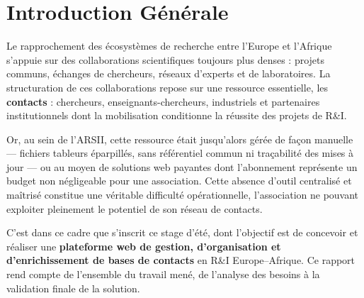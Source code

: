 
\chapter*{Introduction Générale}

Le rapprochement des écosystèmes de recherche entre l'Europe et l'Afrique s'appuie sur des collaborations scientifiques toujours plus denses : projets communs, échanges de chercheurs, réseaux d'experts et de laboratoires. La structuration de ces collaborations repose sur une ressource essentielle, les \textbf{contacts} : chercheurs, enseignants-chercheurs, industriels et partenaires institutionnels dont la mobilisation conditionne la réussite des projets de R\&I.

Or, au sein de l'ARSII, cette ressource était jusqu'alors gérée de façon manuelle --- fichiers tableurs éparpillés, sans référentiel commun ni traçabilité des mises à jour --- ou au moyen de solutions web payantes dont l'abonnement représente un budget non négligeable pour une association. Cette absence d'outil centralisé et maîtrisé constitue une véritable difficulté opérationnelle, l'association ne pouvant exploiter pleinement le potentiel de son réseau de contacts.

C'est dans ce cadre que s'inscrit ce stage d'été, dont l'objectif est de concevoir et réaliser une \textbf{plateforme web de gestion, d'organisation et d'enrichissement de bases de contacts} en R\&I Europe--Afrique. Ce rapport rend compte de l'ensemble du travail mené, de l'analyse des besoins à la validation finale de la solution.
